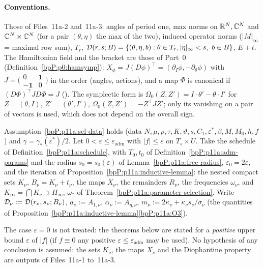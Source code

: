 \paragraph{Conventions.} Those of Files~11a-2 and~11a-3: angles of period one, max norms on $\mathbb{R}^N,\mathbb{C}^N$ and $\mathbb{C}^N\times\mathbb{C}^N$ (for a pair $(\theta,\eta)$ the max of the two), induced operator norms ($\lvert M\rvert_\infty$ = maximal row sum), $T_r$, $\mathcal D(r,s;B)=\{(\theta,\eta,b):\theta\in T_r,\lvert\eta\rvert_\infty<s,\ b\in B\}$, $E+t$. The Hamiltonian field and the bracket are those of Part~0 (Definition~\ref{bpP:p0:hamsymp}): $X_\phi=J(D\phi)^{\top}=(\partial_I\phi,-\partial_\theta\phi)$ with $J=\bigl(\begin{smallmatrix}0&\mathbf 1\\-\mathbf 1&0\end{smallmatrix}\bigr)$ in the order (angles, actions), and a map $\Phi$ is canonical if $(D\Phi)^{\top}JD\Phi=J$ (). The symplectic form is $\Omega_0(Z,Z')=I\cdot\theta'-\theta\cdot I'$ for $Z=(\theta,I)$, $Z'=(\theta',I')$, $\Omega_0(Z,Z')=-Z^{\top}JZ'$; only its vanishing on a pair of vectors is used, which does not depend on the overall sign.

\begin{assumption}\label{bpP:p11a:situation}
Assumption~\ref{bpP:p11a:sel-data} holds (data $N,\mu,\rho,\tau,K,\vartheta,s,C_1,\varepsilon^*,\beta,M,M_0,h,f$) and $\gamma=\gamma_*(\varepsilon^*)/2$. Let $0<\varepsilon\le\varepsilon_{\mathrm{adm}}$ with $\lvert f\rvert\le\varepsilon$ on $T_s\times U$. Take the schedule of Definition~\ref{bpP:p11a:schedule}, with $T_0,t_0$ of Definition~\ref{bpP:p11a:adm-params} and the radius $s_0=s_0(\varepsilon)$ of Lemma~\ref{bpP:p11a:free-radius}, $\varepsilon_0=2\varepsilon$, and the iteration of Proposition~\ref{bpP:p11a:inductive-lemma}: the nested compact sets $K_\nu$, $B_\nu=K_\nu+t_\nu$, the maps $X_\nu$, the remainders $R_\nu$, the frequencies $\omega_\nu$, and $K_\infty=\bigcap K_\nu\supset H_\infty$, $\omega_*$ of Theorem~\ref{bpP:p11a:parameter-selection}. Write $\mathcal D_\nu:=\mathcal D(r_\nu,s_\nu;B_\nu)$, $a_\nu:=A_{1,\nu}$, $\alpha_\nu:=A_{\eta,\nu}$, $m_\nu:=2\kappa_\nu+\kappa_\nu s_\nu/\sigma_\nu$ (the quantities of Proposition~\ref{bpP:p11a:inductive-lemma}\ref{bpP:p11a:O3}).
\end{assumption}
The case $\varepsilon=0$ is not treated: the theorems below are stated for a \emph{positive} upper bound $\varepsilon$ of $\lvert f\rvert$ (if $f\equiv0$ any positive $\varepsilon\le\varepsilon_{\mathrm{adm}}$ may be used). No hypothesis of any conclusion is assumed: the sets $K_\nu$, the maps $X_\nu$ and the Diophantine property are outputs of Files~11a-1 to~11a-3.

